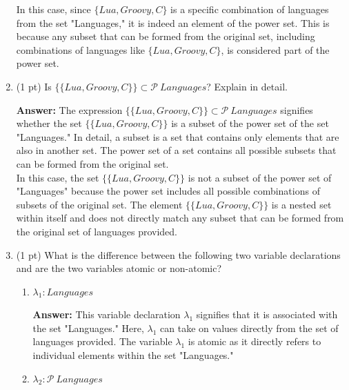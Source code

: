 \documentclass[12pt]{article}
\begin{document}
\begin{spacing}{1.5}
\begin{enumerate}
		      In this case, since $\{Lua, Groovy, C\}$ is a specific combination of languages from the set "Languages," it is indeed an element of the power set. This is because any subset that can be formed from the original set, including combinations of languages like $\{Lua, Groovy, C\}$, is considered part of the power set.\\
		      		      		      		                  
		\item (1 pt) Is $\{\{Lua, Groovy, C\}\} \subset \mathcal{P} \: Languages$? Explain in detail.
		      		      		      		      
		      \textbf{Answer:}  The expression $\{\{Lua, Groovy, C\}\} \subset \mathcal{P} \: Languages$ signifies whether the set $\{\{Lua, Groovy, C\}\}$ is a subset of the power set of the set "Languages." In detail, a subset is a set that contains only elements that are also in another set. The power set of a set contains all possible subsets that can be formed from the original set.\\
		      		      		      		                  
		      In this case, the set $\{\{Lua, Groovy, C\}\}$ is not a subset of the power set of "Languages" because the power set includes all possible combinations of subsets of the original set. The element $\{\{Lua, Groovy, C\}\}$ is a nested set within itself and does not directly match any subset that can be formed from the original set of languages provided.\\
		      		      		      		                  
		\item (1 pt) What is the difference between the following two variable declarations and are the two variables atomic or non-atomic?
		      		      		      		                  
		      \begin{enumerate}
		      	\item $\lambda_1 : Languages$

		      	      \textbf{Answer:} This variable declaration $\lambda_1$ signifies that it is associated with the set "Languages." Here, $\lambda_1$ can take on values directly from the set of languages provided. The variable $\lambda_1$ is atomic as it directly refers to individual elements within the set "Languages."\\

		      	\item $\lambda_2 : \mathcal{P} \: Languages$


\end{enumerate}
\end{enumerate}
\end{spacing}
\end{document}
